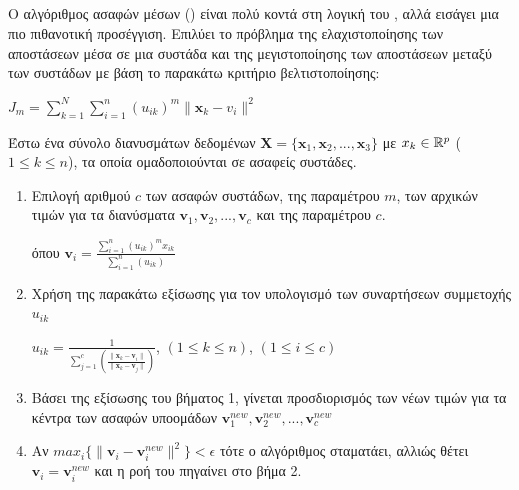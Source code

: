 \subsection{}
Ο αλγόριθμος ασαφών  μέσων () είναι πολύ κοντά στη λογική του , αλλά εισάγει μια πιο πιθανοτική προσέγγιση. Επιλύει το πρόβλημα της ελαχιστοποίησης των αποστάσεων μέσα σε μια συστάδα και της μεγιστοποίησης των αποστάσεων μεταξύ των συστάδων με βάση το παρακάτω κριτήριο βελτιστοποίησης\cite{fuzzyclustering}:
\begin{center}
$J_m = \sum_{k=1}^N\sum_{i=1}^n(u_{ik})^m\|\mathbf{x}_k-v_i\|^2$
\end{center} 
Έστω ένα σύνολο διανυσμάτων δεδομένων $\mathbf{X}=\{\mathbf{x}_1, \mathbf{x}_2, ..., \mathbf{x}_3\}$ με $x_k \in \mathbb{R}^p$ ($1 \leq k \leq n$), τα οποία ομαδοποιούνται σε ασαφείς συστάδες.
\begin{enumerate}
\item Επιλογή αριθμού $c$ των ασαφών συστάδων, της παραμέτρου $m$, των αρχικών τιμών για τα διανύσματα  $\mathbf{v}_1, \mathbf{v}_2, ...,\mathbf{v}_c$ και της παραμέτρου $c$.
\begin{center}
    όπου $\mathbf{v}_i=\frac{\sum_{i=1}^n(u_{ik})^mx_{ik}}{\sum_{i=1}^n(u_{ik})}$
\end{center}
\item Χρήση της παρακάτω εξίσωσης για τον υπολογισμό των συναρτήσεων συμμετοχής $u_{ik}$
\begin{center}
$u_{ik}=\frac{1}{\sum_{j=1}^c (\frac{\|\mathbf{x}_k-\mathbf{v}_i\|}{\|\mathbf{x}_k-\mathbf{v}_j\|})}$, $(1 \leq k \leq n)$, $(1 \leq i \leq c)$
\end{center}
\item Βάσει της εξίσωσης του βήματος 1, γίνεται προσδιορισμός των νέων τιμών για τα κέντρα των ασαφών υποομάδων $\mathbf{v}_1^{new}, \mathbf{v}_2^{new}, ...,\mathbf{v}_c^{new}$
\item Αν $max_i\{\|\mathbf{v}_i-\mathbf{v}_i^{new}\|^2\}<\epsilon$ τότε ο αλγόριθμος σταματάει, αλλιώς θέτει $\mathbf{v}_i=\mathbf{v}_i^{new}$ και η ροή του πηγαίνει στο βήμα 2.

\end{enumerate}
